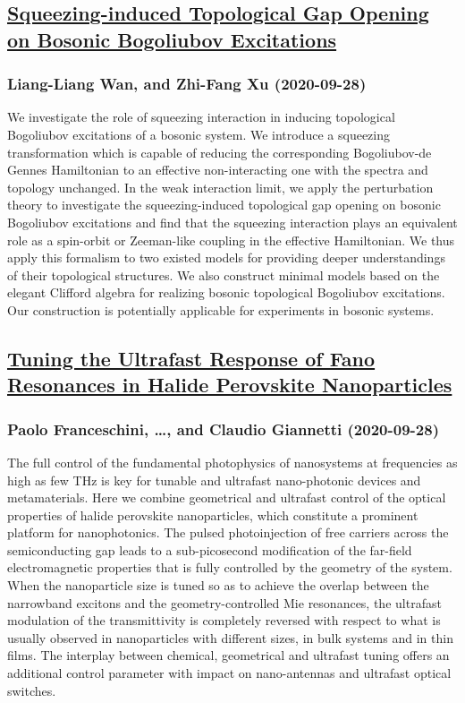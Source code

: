 \subsection*{\href{http://arxiv.org/abs/2009.13110v1}{Squeezing-induced Topological Gap Opening on Bosonic Bogoliubov  Excitations}}
\subsubsection*{Liang-Liang Wan, and Zhi-Fang Xu (2020-09-28)}
We investigate the role of squeezing interaction in inducing topological
Bogoliubov excitations of a bosonic system. We introduce a squeezing
transformation which is capable of reducing the corresponding Bogoliubov-de
Gennes Hamiltonian to an effective non-interacting one with the spectra and
topology unchanged. In the weak interaction limit, we apply the perturbation
theory to investigate the squeezing-induced topological gap opening on bosonic
Bogoliubov excitations and find that the squeezing interaction plays an
equivalent role as a spin-orbit or Zeeman-like coupling in the effective
Hamiltonian. We thus apply this formalism to two existed models for providing
deeper understandings of their topological structures. We also construct
minimal models based on the elegant Clifford algebra for realizing bosonic
topological Bogoliubov excitations. Our construction is potentially applicable
for experiments in bosonic systems.

\subsection*{\href{http://arxiv.org/abs/2009.13109v1}{Tuning the Ultrafast Response of Fano Resonances in Halide Perovskite  Nanoparticles}}
\subsubsection*{Paolo Franceschini, \dots, and Claudio Giannetti (2020-09-28)}
The full control of the fundamental photophysics of nanosystems at
frequencies as high as few THz is key for tunable and ultrafast nano-photonic
devices and metamaterials. Here we combine geometrical and ultrafast control of
the optical properties of halide perovskite nanoparticles, which constitute a
prominent platform for nanophotonics. The pulsed photoinjection of free
carriers across the semiconducting gap leads to a sub-picosecond modification
of the far-field electromagnetic properties that is fully controlled by the
geometry of the system. When the nanoparticle size is tuned so as to achieve
the overlap between the narrowband excitons and the geometry-controlled Mie
resonances, the ultrafast modulation of the transmittivity is completely
reversed with respect to what is usually observed in nanoparticles with
different sizes, in bulk systems and in thin films. The interplay between
chemical, geometrical and ultrafast tuning offers an additional control
parameter with impact on nano-antennas and ultrafast optical switches.

